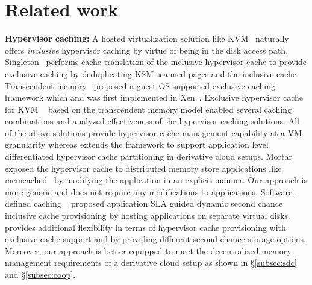 \section{Related work}
\label{sec:related}
\noindent
{\bf Hypervisor caching:} A hosted virtualization solution like 
KVM~\cite{kvm, kvmconfig} naturally offers \emph{inclusive}
hypervisor caching by virtue of being in the disk access path.
%
Singleton~\cite{singleton} performs cache translation of the
inclusive hypervisor cache to provide exclusive caching by deduplicating
KSM scanned pages and the inclusive cache.
%
Transcendent memory~\cite{memtrans} proposed a guest OS supported
exclusive caching framework which and was
first implemented in Xen~\cite{oracletmem}.
%  
Exclusive hypervisor cache for KVM ~\cite{kvmzcache} based on the 
transcendent memory model enabled several caching combinations and 
analyzed effectiveness of the hypervisor caching solutions.
%  
All of the above solutions provide hypervisor cache management capability
at a VM granularity whereas \dd{} extends the framework to support application
level differentiated hypervisor cache partitioning in derivative
cloud setups.
%
Mortar~\cite{mortar} exposed the hypervisor cache to distributed memory store 
applications like \textrm{memcached}~\cite{memcached} by modifying the application in an
explicit manner.
%
Our approach is more generic and does not require any modifications to 
applications.
%
Software-defined caching ~\cite{sdc} proposed application SLA guided 
dynamic second chance inclusive cache provisioning by hosting applications 
on separate virtual disks.
%
\dd{} provides additional flexibility in terms of hypervisor cache provisioning
with exclusive cache support and by providing different second chance storage options.
%
Moreover, our approach is better equipped to meet the decentralized memory 
management requirements of a derivative cloud setup as shown 
in \S\ref{subsec:sdc} and \S\ref{subsec:coop}.

